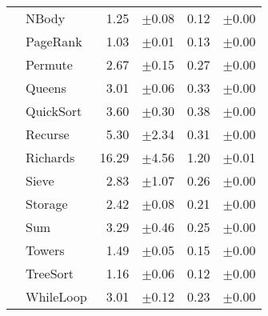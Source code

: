 \begin{tabular}{ll@{\hspace{6pt}}r@{\hspace{3pt}}l@{\hspace{6pt}}r@{\hspace{3pt}}l}
 & NBody & 1.25 & \scriptsize\textcolor{gray!60}{$\pm$0.08} & 0.12 & \scriptsize\textcolor{gray!60}{$\pm$0.00} \\
 & PageRank & 1.03 & \scriptsize\textcolor{gray!60}{$\pm$0.01} & 0.13 & \scriptsize\textcolor{gray!60}{$\pm$0.00} \\
 & Permute & 2.67 & \scriptsize\textcolor{gray!60}{$\pm$0.15} & 0.27 & \scriptsize\textcolor{gray!60}{$\pm$0.00} \\
 & Queens & 3.01 & \scriptsize\textcolor{gray!60}{$\pm$0.06} & 0.33 & \scriptsize\textcolor{gray!60}{$\pm$0.00} \\
 & QuickSort & 3.60 & \scriptsize\textcolor{gray!60}{$\pm$0.30} & 0.38 & \scriptsize\textcolor{gray!60}{$\pm$0.00} \\
 & Recurse & 5.30 & \scriptsize\textcolor{gray!60}{$\pm$2.34} & 0.31 & \scriptsize\textcolor{gray!60}{$\pm$0.00} \\
 & Richards & 16.29 & \scriptsize\textcolor{gray!60}{$\pm$4.56} & 1.20 & \scriptsize\textcolor{gray!60}{$\pm$0.01} \\
 & Sieve & 2.83 & \scriptsize\textcolor{gray!60}{$\pm$1.07} & 0.26 & \scriptsize\textcolor{gray!60}{$\pm$0.00} \\
 & Storage & 2.42 & \scriptsize\textcolor{gray!60}{$\pm$0.08} & 0.21 & \scriptsize\textcolor{gray!60}{$\pm$0.00} \\
 & Sum & 3.29 & \scriptsize\textcolor{gray!60}{$\pm$0.46} & 0.25 & \scriptsize\textcolor{gray!60}{$\pm$0.00} \\
 & Towers & 1.49 & \scriptsize\textcolor{gray!60}{$\pm$0.05} & 0.15 & \scriptsize\textcolor{gray!60}{$\pm$0.00} \\
 & TreeSort & 1.16 & \scriptsize\textcolor{gray!60}{$\pm$0.06} & 0.12 & \scriptsize\textcolor{gray!60}{$\pm$0.00} \\
 & WhileLoop & 3.01 & \scriptsize\textcolor{gray!60}{$\pm$0.12} & 0.23 & \scriptsize\textcolor{gray!60}{$\pm$0.00} \\
\bottomrule
\end{tabular}